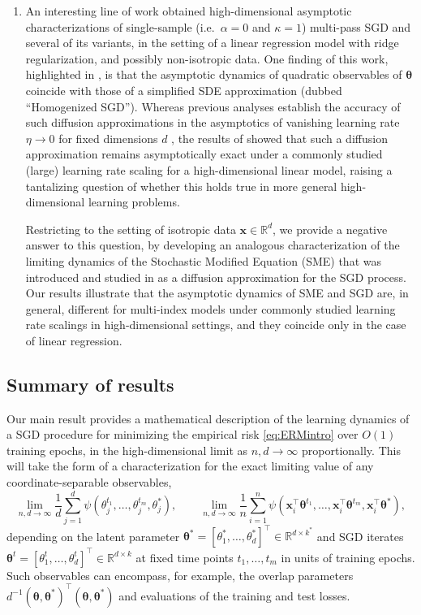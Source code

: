 \documentclass[11pt,letterpaper,reqno]{amsart}
\theoremstyle{definition}
\def\R{\mathbb{R}}
\def\x{\mathbf{x}}
\def\btheta{\boldsymbol{\theta}}
\begin{document}
\begin{enumerate}[1.]
\item An interesting line of work
\cite{paquette2021dynamics,paquette2021sgd,lee2022trajectory,paquette2022implicit,marshall2024clip,paquette2025homogenization} obtained high-dimensional
asymptotic characterizations of single-sample (i.e.\ $\alpha=0$ and $\kappa=1$) multi-pass SGD
and several of its variants, in the setting of a linear regression
model with ridge regularization, and possibly non-isotropic data. One finding of
this work, highlighted in \cite{paquette2022implicit,paquette2025homogenization}, is that the asymptotic dynamics of
quadratic observables of $\btheta$ coincide
with those of a simplified SDE approximation (dubbed ``Homogenized
SGD''). Whereas previous analyses establish the accuracy of such
diffusion approximations in the asymptotics of vanishing learning rate
$\eta \to 0$ for fixed dimensions $d$ \cite{li2019stochastic,hu2019diffusion}, the results of \cite{paquette2025homogenization}
showed that such a diffusion approximation remains asymptotically
exact under a commonly studied (large) learning rate scaling for a
high-dimensional linear model, raising a tantalizing question of whether this
holds true in more general high-dimensional learning problems.

Restricting to the setting of isotropic data $\x \in \R^d$, we provide a
negative answer to this question, by developing an analogous characterization
of the limiting dynamics of the Stochastic Modified Equation (SME) that was introduced and studied in \cite{li2017stochastic,li2019stochastic}
as a diffusion approximation for the SGD process.
Our results illustrate that the asymptotic dynamics of SME and SGD are, in
general, different for multi-index models under commonly studied learning
rate scalings in high-dimensional settings, and they coincide only in the case of linear regression.
\end{enumerate}

\subsection{Summary of results}

Our main result provides a mathematical description of the
learning dynamics of a SGD procedure for minimizing the
empirical risk \eqref{eq:ERMintro} over $O(1)$ training epochs, in the
high-dimensional limit as $n,d \to \infty$ proportionally. This will
take the form of a characterization for the exact limiting value of any
coordinate-separable observables,
\[\lim_{n,d \to \infty} \frac{1}{d}\sum_{j=1}^d
\psi(\theta_j^{t_1},\ldots,\theta_j^{t_m},\theta_j^*),
\qquad \lim_{n,d \to \infty} \frac{1}{n}\sum_{i=1}^n
\psi(\x_i^\top \btheta^{t_1},\ldots,\x_i^\top \btheta^{t_m},\x_i^\top
\btheta^*),\]
depending on the latent parameter $\btheta^*=[\theta_1^*,\ldots,\theta_d^*]^\top
\in \R^{d \times k^*}$ and SGD iterates
$\btheta^t=[\theta_1^t,\ldots,\theta_d^t]^\top \in \R^{d \times k}$
at fixed time points $t_1,\ldots,t_m$ in units of training epochs. Such
observables can encompass, for example, the overlap parameters
$d^{-1}(\btheta,\btheta^*)^\top(\btheta,\btheta^*)$ and evaluations of the
training and test losses.
\end{document}
